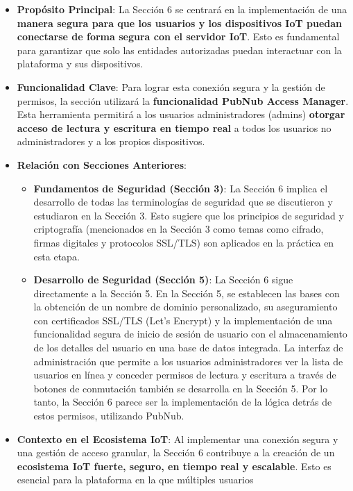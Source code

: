 \documentclass{report}
\begin{document}
\begin{itemize}
    \item \textbf{Propósito Principal}: La Sección 6 se centrará en la implementación de una \textbf{manera segura para que los usuarios y los dispositivos 
    IoT puedan conectarse de forma segura con el servidor IoT}. Esto es fundamental para garantizar que solo las entidades autorizadas puedan interactuar 
    con la plataforma y sus dispositivos.
    \item \textbf{Funcionalidad Clave}: Para lograr esta conexión segura y la gestión de permisos, la sección utilizará la \textbf{funcionalidad PubNub 
    Access Manager}. Esta herramienta permitirá a los usuarios administradores (admins) \textbf{otorgar acceso de lectura y escritura en tiempo real} a 
    todos los usuarios no administradores y a los propios dispositivos.
    \item \textbf{Relación con Secciones Anteriores}:
    \begin{itemize}
        \item \textbf{Fundamentos de Seguridad (Sección 3)}: La Sección 6 implica el desarrollo de todas las terminologías de seguridad que se discutieron 
        y estudiaron en la Sección 3. Esto sugiere que los principios de seguridad y criptografía (mencionados en la Sección 3 como temas como cifrado, 
        firmas digitales y protocolos SSL/TLS) son aplicados en la práctica en esta etapa.
        \item \textbf{Desarrollo de Seguridad (Sección 5)}: La Sección 6 sigue directamente a la Sección 5. En la Sección 5, se establecen las bases con 
        la obtención de un nombre de dominio personalizado, su aseguramiento con certificados SSL/TLS (Let's Encrypt) y la implementación de una 
        funcionalidad segura de inicio de sesión de usuario con el almacenamiento de los detalles del usuario en una base de datos integrada. 
        La interfaz de administración que permite a los usuarios administradores ver la lista de usuarios en línea y conceder permisos de lectura y 
        escritura a través de botones de conmutación también se desarrolla en la Sección 5. Por lo tanto, la Sección 6 parece ser la implementación 
        de la lógica detrás de estos permisos, utilizando PubNub.
    \end{itemize}
    \item \textbf{Contexto en el Ecosistema IoT}: Al implementar una conexión segura y una gestión de acceso granular, la Sección 6 contribuye a la 
    creación de un \textbf{ecosistema IoT fuerte, seguro, en tiempo real y escalable}. Esto es esencial para la plataforma en la que múltiples usuarios 

\end{itemize}
\end{document}
